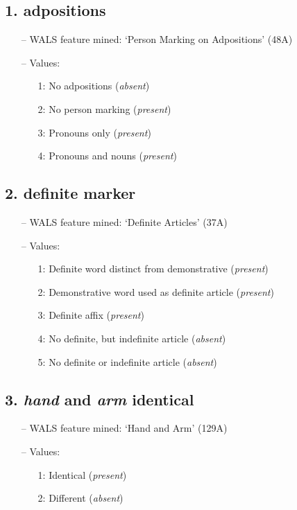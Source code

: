 \subsection*{1. adpositions}

\begin{itemize}
\item[--] WALS feature mined: `Person Marking on Adpositions' (48A)
\item[--] Values:

\begin{enumerate}
\item[1:] No adpositions (\emph{absent})
\item[2:] No person marking (\emph{present})
\item[3:] Pronouns only (\emph{present})
\item[4:] Pronouns and nouns (\emph{present})
\end{enumerate}
\end{itemize}

\subsection*{2. definite marker}

\begin{itemize}
\item[--] WALS feature mined: `Definite Articles' (37A)
\item[--] Values:

\begin{enumerate}
\item[1:] Definite word distinct from demonstrative (\emph{present})
\item[2:] Demonstrative word used as definite article (\emph{present})
\item[3:] Definite affix (\emph{present})
\item[4:] No definite, but indefinite article (\emph{absent})
\item[5:] No definite or indefinite article (\emph{absent})
\end{enumerate}
\end{itemize}

\subsection*{3. \emph{hand} and \emph{arm} identical}

\begin{itemize}
\item[--] WALS feature mined: `Hand and Arm' (129A)
\item[--] Values:

\begin{enumerate}
\item[1:] Identical (\emph{present})
\item[2:] Different (\emph{absent})
\end{enumerate}
\end{itemize}


